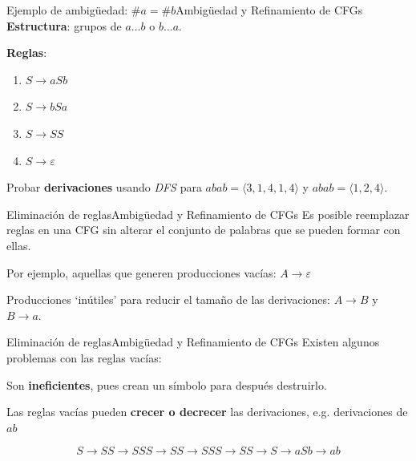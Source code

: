 \documentclass[spanish]{beamer}
\begin{document}
\begin{frame}{Ejemplo de ambigüedad: $\#a = \#b$}{Ambigüedad y Refinamiento de CFGs}
    \textbf{Estructura}: grupos de $a \dots b$ o $b \dots a$. \pause

    \bigskip

    \textbf{Reglas}:
    \begin{enumerate}
        \item $S \to aSb$
        \item $S \to bSa$
        \item $S \to SS$
        \item $S \to \varepsilon$
    \end{enumerate} \pause

    \bigskip

    Probar \textbf{derivaciones} usando \textit{DFS} para $abab = \langle 3, 1, 4, 1, 4  \rangle$ y $ abab = \langle 1, 2, 4 \rangle$.
\end{frame}

\begin{frame}{Eliminación de reglas}{Ambigüedad y Refinamiento de CFGs}
    Es posible reemplazar reglas en una CFG sin alterar el conjunto de palabras que se pueden formar con ellas. \pause

    \bigskip

    Por ejemplo, aquellas que generen producciones vacías: $A \to \varepsilon$ \pause

    \bigskip

    Producciones `inútiles' para reducir el tamaño de las derivaciones: $A \to B$ y $B \to a$.
\end{frame}

\begin{frame}{Eliminación de reglas}{Ambigüedad y Refinamiento de CFGs}
    Existen algunos problemas con las reglas vacías: \pause

    \bigskip

    Son \textbf{ineficientes}, pues crean un símbolo para después destruirlo. \pause

    \bigskip

    Las reglas vacías pueden \textbf{crecer o decrecer} las derivaciones, e.g. derivaciones de $ab$ \pause

    \bigskip

    $$S \to SS \to SSS \to SS \to SSS \to SS \to S \to aSb \to ab$$
\end{frame}
\end{document}
